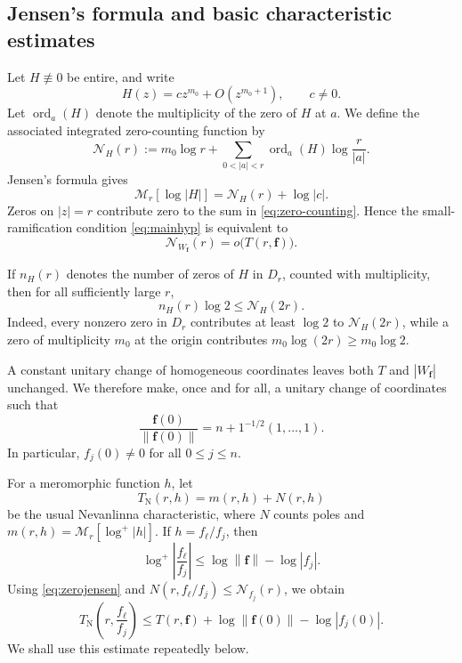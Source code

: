 \documentclass[12pt,letterpaper,reqno]{amsart}
\theoremstyle{definition}
\numberwithin{equation}{section}
\newcommand{\NN}{\mathcal N}
\newcommand{\TN}{T_{\mathrm N}}
\newcommand{\mean}[2]{\mathcal M_{#1}\!\left[#2\right]}
\newcommand{\norm}[1]{\left\lVert#1\right\rVert}
\DeclareMathOperator{\ord}{ord}
\newcommand{\fv}{\bm f}
\begin{document}
\subsection{Jensen's formula and basic characteristic estimates}

Let \(H\not\equiv0\) be entire, and write
\[
H(z)=cz^{m_0}+O(z^{m_0+1}),\qquad c\ne0.
\]
Let $\ord_a(H)$ denote the multiplicity of the zero of $H$ at $a$.
We define the associated integrated zero-counting function by
\begin{equation}\label{eq:zero-counting}
 \NN_H(r):=m_0\log r+
 \sum_{0<|a|<r}\ord_a(H)\log\frac r{|a|}.
\end{equation}
Jensen's formula gives
\begin{equation}\label{eq:zerojensen}
 \mean r{\log|H|}=\NN_H(r)+\log|c|.
\end{equation}
Zeros on \(|z|=r\) contribute zero to the sum in
\eqref{eq:zero-counting}. Hence the small-ramification condition
\eqref{eq:mainhyp} is equivalent to
\[
\NN_{W_{\fv}}(r)=o\bigl(T(r,\fv)\bigr).
\]

If \(n_H(r)\) denotes the number of zeros of \(H\) in \(D_r\), counted with
multiplicity, then for all sufficiently large \(r\),
\begin{equation}\label{eq:countbound}
 n_H(r)\log2\leq \NN_H(2r).
\end{equation}
Indeed, every nonzero zero in \(D_r\) contributes at least \(\log2\) to
\(\NN_H(2r)\), while a zero of multiplicity \(m_0\) at the origin contributes
\(m_0\log(2r)\ge m_0\log2\).

A constant unitary change of homogeneous coordinates leaves both \(T\) and
\(|W_{\fv}|\) unchanged. We therefore make, once and for all, a unitary change
of coordinates such that
\[
\frac{\fv(0)}{\norm{\fv(0)}}={n+1}^{-1/2}(1,\ldots,1).
\]
In particular, $
f_j(0)\ne0
$ for all $0\le j\le n$.

For a meromorphic function \(h\), let
\[
\TN(r,h)=m(r,h)+N(r,h)
\]
be the usual Nevanlinna characteristic, where \(N\) counts poles and
\(m(r,h)=\mean r{\log^+|h|}\). If \(h=f_\ell/f_j\), then
\[
\log^+\left|\frac{f_\ell}{f_j}\right|
 \leq \log\norm{\fv}-\log|f_j|.
\]
Using \eqref{eq:zerojensen} and
\(N(r,f_\ell/f_j)\leq\NN_{f_j}(r)\), we obtain
\begin{equation}\label{eq:quotientbound}
 \TN\!\left(r,\frac{f_\ell}{f_j}\right)
 \leq T(r,\fv)+\log\norm{\fv(0)}-\log|f_j(0)|.
\end{equation}
We shall use this estimate repeatedly below.
\end{document}
